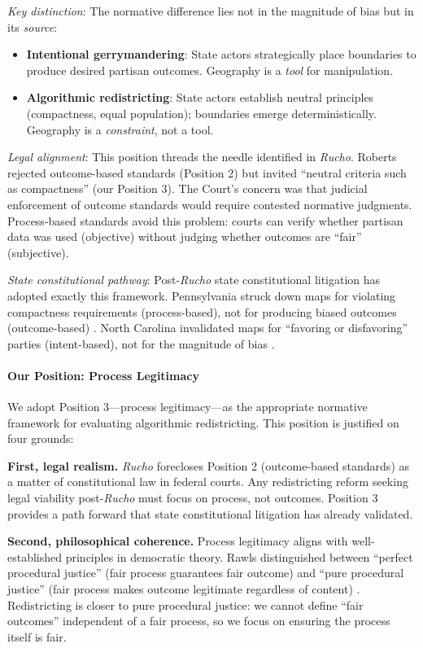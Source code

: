 \textit{Key distinction}: The normative difference lies not in the magnitude of bias but in its \textit{source}:
\begin{itemize}
\item \textbf{Intentional gerrymandering}: State actors strategically place boundaries to produce desired partisan outcomes. Geography is a \textit{tool} for manipulation.
\item \textbf{Algorithmic redistricting}: State actors establish neutral principles (compactness, equal population); boundaries emerge deterministically. Geography is a \textit{constraint}, not a tool.
\end{itemize}

\textit{Legal alignment}: This position threads the needle identified in \textit{Rucho}. Roberts rejected outcome-based standards (Position 2) but invited ``neutral criteria such as compactness'' (our Position 3). The Court's concern was that judicial enforcement of outcome standards would require contested normative judgments. Process-based standards avoid this problem: courts can verify whether partisan data was used (objective) without judging whether outcomes are ``fair'' (subjective).

\textit{State constitutional pathway}: Post-\textit{Rucho} state constitutional litigation has adopted exactly this framework. Pennsylvania struck down maps for violating compactness requirements (process-based), not for producing biased outcomes (outcome-based) \citep{league2018pa}. North Carolina invalidated maps for ``favoring or disfavoring'' parties (intent-based), not for the magnitude of bias \citep{harper2022nc}.

\paragraph{Our Position: Process Legitimacy}

We adopt Position 3---process legitimacy---as the appropriate normative framework for evaluating algorithmic redistricting. This position is justified on four grounds:

\textbf{First, legal realism.} \textit{Rucho} forecloses Position 2 (outcome-based standards) as a matter of constitutional law in federal courts. Any redistricting reform seeking legal viability post-\textit{Rucho} must focus on process, not outcomes. Position 3 provides a path forward that state constitutional litigation has already validated.

\textbf{Second, philosophical coherence.} Process legitimacy aligns with well-established principles in democratic theory. Rawls distinguished between ``perfect procedural justice'' (fair process guarantees fair outcome) and ``pure procedural justice'' (fair process makes outcome legitimate regardless of content) \citep{rawls1971}. Redistricting is closer to pure procedural justice: we cannot define ``fair outcomes'' independent of a fair process, so we focus on ensuring the process itself is fair.

